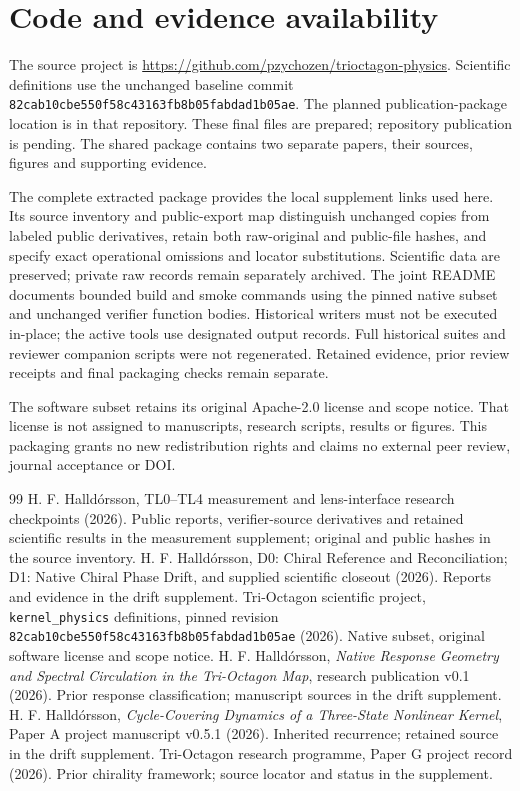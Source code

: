 \documentclass[11pt,a4paper]{article}
\begin{document}
\section*{Code and evidence availability}
The source project is \url{https://github.com/pzychozen/trioctagon-physics}. Scientific definitions use the unchanged baseline commit \texttt{82cab10cbe550f58c43163fb8b05fabdad1b05ae}.
The planned publication-package location is  in that repository. These final files are prepared; repository publication is pending. The shared package contains two separate papers, their sources, figures and supporting evidence.

The complete extracted package provides the local supplement links used here. Its source inventory and public-export map distinguish unchanged copies from labeled public derivatives, retain both raw-original and public-file hashes, and specify exact operational omissions and locator substitutions. Scientific data are preserved; private raw records remain separately archived.
The joint README documents bounded build and smoke commands using the pinned native subset and unchanged verifier function bodies. Historical writers must not be executed in-place; the active tools use designated output records. Full historical suites and reviewer companion scripts were not regenerated. Retained evidence, prior review receipts and final packaging checks remain separate.

The software subset retains its original Apache-2.0 license and scope notice. That license is not assigned to manuscripts, research scripts, results or figures. This packaging grants no new redistribution rights and claims no external peer review, journal acceptance or DOI.

\begin{thebibliography}{99}
 H. F. Halldórsson, TL0--TL4 measurement and lens-interface research checkpoints (2026). Public reports, verifier-source derivatives and retained scientific results in the measurement supplement; original and public hashes in the source inventory.
 H. F. Halldórsson, D0: Chiral Reference and Reconciliation; D1: Native Chiral Phase Drift, and supplied scientific closeout (2026). Reports and evidence in the drift supplement.
 Tri-Octagon scientific project, \texttt{kernel\_physics} definitions, pinned revision \texttt{82cab10cbe550f58c43163fb8b05fabdad1b05ae} (2026). Native subset, original software license and scope notice.
 H. F. Halldórsson, \emph{Native Response Geometry and Spectral Circulation in the Tri-Octagon Map}, research publication v0.1 (2026). Prior response classification; manuscript sources in the drift supplement.
 H. F. Halldórsson, \emph{Cycle-Covering Dynamics of a Three-State Nonlinear Kernel}, Paper A project manuscript v0.5.1 (2026). Inherited recurrence; retained source in the drift supplement.
 Tri-Octagon research programme, Paper G project record (2026). Prior chirality framework; source locator and status in the supplement.

\end{thebibliography}
\end{document}
